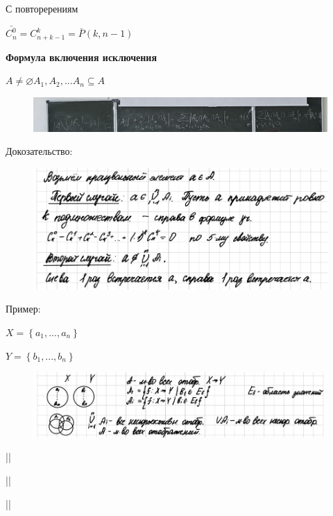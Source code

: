 \documentclass{article}
\begin{document}
\vspace{5mm}

С повторерениям 

$\bar{C_{n}^{0}} = C_{n+k-1}^{k} = \bar{P}(k,n-1)$


\textbf{Формула включения исключения}

$A \neq \varnothing A_1, A_2,...A_n \subseteq A$

\begin{figure}[H]
    \centering
    \includegraphics[width=1\linewidth]
    {12c36b33-baa5-41a2-b016-b02e7ad225c8.jpg}
\end{figure}

Докозательство:

\begin{figure}[H]
    \centering
    \includegraphics[width=1\linewidth]{Снимок экрана 2025-02-21 145919.png}
\end{figure}

Пример:

$X=\left\{a_1,...,a_n \right\}$

$Y=\left\{b_1,...,b_n\right\}$


\begin{figure}[H]
    \centering
    \includegraphics[width=1\linewidth]{Снимок экрана 2025-02-21 150506.png}
\end{figure}

||

||

||
\end{document}
